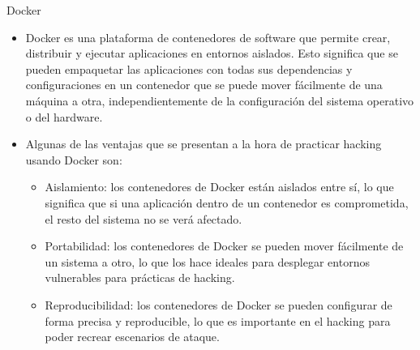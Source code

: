 \documentclass[aspectratio=169,11pt]{beamer}
\begin{document}
\begin{frame}[allowframebreaks]{Docker}
\small
  \begin{itemize}
  \item Docker es una plataforma de contenedores de software que permite crear, distribuir y ejecutar aplicaciones en entornos aislados. Esto significa que se pueden empaquetar las aplicaciones con todas sus dependencias y configuraciones en un contenedor que se puede mover fácilmente de una máquina a otra, independientemente de la configuración del sistema operativo o del hardware.
  \item Algunas de las ventajas que se presentan a la hora de practicar hacking usando Docker son:
  \begin{itemize}

  \item Aislamiento: los contenedores de Docker están aislados entre sí, lo que significa que si una aplicación dentro de un contenedor es comprometida, el resto del sistema no se verá afectado.
  \item Portabilidad: los contenedores de Docker se pueden mover fácilmente de un sistema a otro, lo que los hace ideales para desplegar entornos vulnerables para prácticas de hacking.
  \item Reproducibilidad: los contenedores de Docker se pueden configurar de forma precisa y reproducible, lo que es importante en el hacking para poder recrear escenarios de ataque.
  \end{itemize}

  \end{itemize}
\end{frame}
\end{document}
